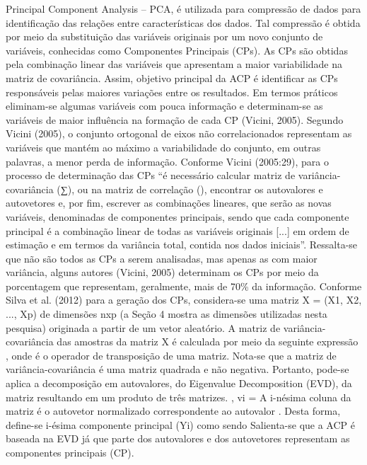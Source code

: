 Principal Component Analysis – PCA, é utilizada para compressão de dados para identificação das relações entre características dos dados. Tal compressão é obtida por meio da substituição das variáveis originais por um novo conjunto de variáveis, conhecidas como Componentes Principais (CPs). As CPs são obtidas pela combinação linear das variáveis que apresentam a maior variabilidade na matriz de covariância. Assim, objetivo principal da ACP é identificar as CPs responsáveis pelas maiores variações entre os resultados. Em termos práticos eliminam-se algumas variáveis com pouca informação e determinam-se as variáveis de maior influência na formação de cada CP (Vicini, 2005).
Segundo Vicini (2005), o conjunto ortogonal de eixos não correlacionados representam as variáveis que mantém ao máximo a variabilidade do conjunto, em outras palavras, a menor perda de informação. 
Conforme Vicini (2005:29), para o processo de determinação das CPs 
“é necessário calcular matriz de variância-covariância (∑), ou na matriz de correlação (), encontrar os autovalores e autovetores e, por fim, escrever as combinações lineares, que serão as novas variáveis, denominadas de componentes principais, sendo que cada componente principal é a combinação linear de todas as variáveis originais [...] em ordem de estimação e em termos da variância total, contida nos dados iniciais”. 
Ressalta-se que não são todos as CPs a serem analisadas, mas apenas as com maior variância, alguns autores (Vicini, 2005) determinam os CPs por meio da porcentagem que representam, geralmente, mais de 70\% da informação. 
Conforme Silva et al. (2012) para a geração dos CPs, considera-se uma matriz X = (X1, X2, ..., Xp) de dimensões nxp (a Seção 4 mostra as dimensões utilizadas nesta pesquisa) originada a partir de um vetor aleatório. A matriz de variância-covariância  das amostras da matriz X é calculada por meio da seguinte expressão , onde é o operador de transposição de uma matriz. Nota-se que a matriz de variância-covariância é uma matriz quadrada e não negativa. Portanto, pode-se aplica a decomposição em autovalores, do Eigenvalue Decomposition (EVD), da matriz  resultando em um produto de três matrizes.
,
vi = 
A i-nésima coluna da matriz  é o autovetor normalizado  correspondente ao autovalor . Desta forma, define-se i-ésima componente principal (Yi) como sendo
Salienta-se que a ACP é baseada na EVD já que parte dos autovalores e dos autovetores representam as componentes principais (CP). 
